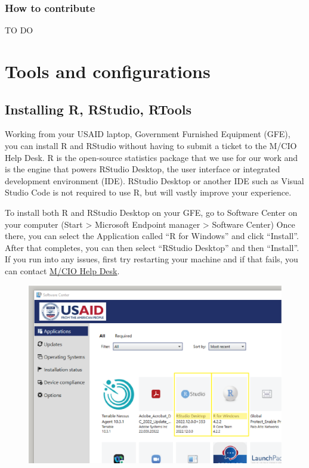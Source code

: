 \documentclass[
  letterpaper,
  DIV=11,
  numbers=noendperiod]{scrreprt}
\begin{document}
\hypertarget{how-to-contribute}{%
\section{How to contribute}\label{how-to-contribute}}

TO DO

\part{Tools and configurations}

\hypertarget{installing-r-rstudio-rtools}{%
\chapter{Installing R, RStudio,
RTools}\label{installing-r-rstudio-rtools}}

Working from your USAID laptop, Government Furnished Equipment (GFE),
you can install R and RStudio without having to submit a ticket to the
M/CIO Help Desk. R is the open-source statistics package that we use for
our work and is the engine that powers RStudio Desktop, the user
interface or integrated development environment (IDE). RStudio Desktop
or another IDE such as Visual Studio Code is not required to use R, but
will vastly improve your experience.

To install both R and RStudio Desktop on your GFE, go to Software Center
on your computer (Start \textgreater{} Microsoft Endpoint manager
\textgreater{} Software Center) Once there, you can select the
Application called ``R for Windows'' and click ``Install''. After that
completes, you can then select ``RStudio Desktop'' and then ``Install''.
If you run into any issues, first try restarting your machine and if
that fails, you can contact \href{CIO-HELPDESK@usaid.gov}{M/CIO Help
Desk}.

\begin{figure}

{\centering \includegraphics{./images/r_setup-software-center_r.png}

}

\end{figure}
\end{document}
